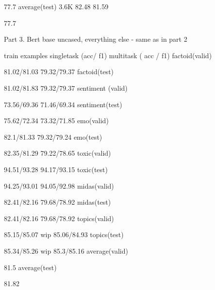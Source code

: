 77.7
average(test)
3.6K
82.48
81.59




77.7










Part 3. Bert base uncased, everything else - same as in part 2




train examples
singletask (acc/ f1)
multitask
( acc / f1)
factoid(valid)


81.02/81.03
79.32/79.37
factoid(test)


81.02/81.83
79.32/79.37
sentiment (valid)


73.56/69.36
71.46/69.34
sentiment(test)


75.62/72.34
73.32/71.85
emo(valid)


82.1/81.33
79.32/79.24
emo(test)


82.35/81.29
79.22/78.65
toxic(valid)


94.51/93.28
94.17/93.15
toxic(test)


94.25/93.01
94.05/92.98
midas(valid)


82.41/82.16
79.68/78.92
midas(test)


82.41/82.16
79.68/78.92
topics(valid)


85.15/85.07 wip
85.06/84.93
topics(test)


85.34/85.26 wip
85.3/85.16
average(valid)




81.5
average(test)




81.82


